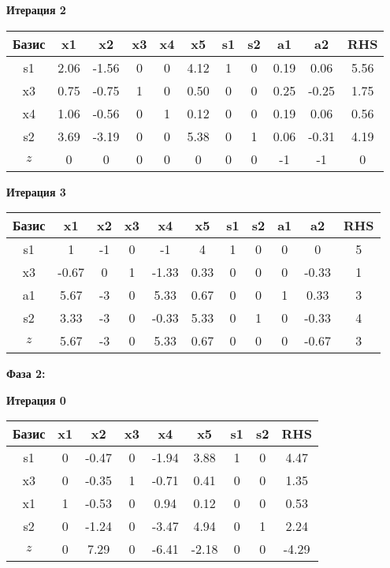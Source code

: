 \documentclass[a4paper,12pt]{article}
\begin{document}
 \textbf{Итерация 2}\\
\begin{tabular}{|c|c|c|c|c|c|c|c|c|c|c|}
\hline
Базис & x1 & x2 & x3 & x4 & x5 & s1 & s2 & a1 & a2 & RHS \\ \hline
s1 & 2.06 & -1.56 & 0 & 0 & 4.12 & 1 & 0 & 0.19 & 0.06 & 5.56 \\ \hline
x3 & 0.75 & -0.75 & 1 & 0 & 0.50 & 0 & 0 & 0.25 & -0.25 & 1.75 \\ \hline
x4 & 1.06 & -0.56 & 0 & 1 & 0.12 & 0 & 0 & 0.19 & 0.06 & 0.56 \\ \hline
s2 & 3.69 & -3.19 & 0 & 0 & 5.38 & 0 & 1 & 0.06 & -0.31 & 4.19 \\ \hline
$z$ & 0 & 0 & 0 & 0 & 0 & 0 & 0 & -1 & -1 & 0 \\ \hline
\end{tabular}
\vspace{5mm}

 \textbf{Итерация 3}\\
\begin{tabular}{|c|c|c|c|c|c|c|c|c|c|c|}
\hline
Базис & x1 & x2 & x3 & x4 & x5 & s1 & s2 & a1 & a2 & RHS \\ \hline
s1 & 1 & -1 & 0 & -1 & 4 & 1 & 0 & 0 & 0 & 5 \\ \hline
x3 & -0.67 & 0 & 1 & -1.33 & 0.33 & 0 & 0 & 0 & -0.33 & 1 \\ \hline
a1 & 5.67 & -3 & 0 & 5.33 & 0.67 & 0 & 0 & 1 & 0.33 & 3 \\ \hline
s2 & 3.33 & -3 & 0 & -0.33 & 5.33 & 0 & 1 & 0 & -0.33 & 4 \\ \hline
$z$ & 5.67 & -3 & 0 & 5.33 & 0.67 & 0 & 0 & 0 & -0.67 & 3 \\ \hline
\end{tabular}
\vspace{5mm}

\textbf{Фаза 2:}


 \textbf{Итерация 0}\\
\begin{tabular}{|c|c|c|c|c|c|c|c|c|}
\hline
Базис & x1 & x2 & x3 & x4 & x5 & s1 & s2 & RHS \\ \hline
s1 & 0 & -0.47 & 0 & -1.94 & 3.88 & 1 & 0 & 4.47 \\ \hline
x3 & 0 & -0.35 & 1 & -0.71 & 0.41 & 0 & 0 & 1.35 \\ \hline
x1 & 1 & -0.53 & 0 & 0.94 & 0.12 & 0 & 0 & 0.53 \\ \hline
s2 & 0 & -1.24 & 0 & -3.47 & 4.94 & 0 & 1 & 2.24 \\ \hline
$z$ & 0 & 7.29 & 0 & -6.41 & -2.18 & 0 & 0 & -4.29 \\ \hline
\end{tabular}
\vspace{5mm}
\end{document}
